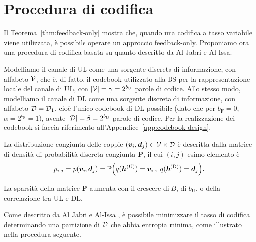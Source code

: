\section{Procedura di codifica}
\label{sec:procedure}

Il Teorema~\ref{thm:feedback-only} mostra che, quando una codifica a tasso
variabile viene utilizzata, è possibile operare un approccio feedback-only.
Proponiamo ora una procedura di codifica basata su quanto descritto da Al Jabri
e Al-Issa.\cite{10.1007/BFb0024445}

Modelliamo il canale di UL come una sorgente discreta di informazione, con
alfabeto \(\mathcal{V}\), che è, di fatto, il codebook utilizzato alla BS per la
rappresentazione locale del canale di UL, con \(\abs{\set{V}} = \gamma =
2^{b_\mathrm{U}}\) parole di codice. Allo stesso modo, modelliamo il canale di
DL come una sorgente discreta di informazione, con alfabeto \(\mathcal{D} =
\mathcal{D}_1\), cioè l'unico codebook di DL possibile (dato che per \(b_\mathrm{F}
= 0\), \(\alpha = 2^{b_\mathrm{F}} = 1\)), avente \(\abs{\set{D}} = \beta =
2^{b_\mathrm{B}}\) parole di codice. Per la realizzazione dei codebook si
faccia riferimento all'Appendice~\ref{app:codebook-design}.

La distribuzione congiunta delle coppie \((\bm{v}_i,\bm{d}_j) \in
\mathcal{V} \times \mathcal{D}\) è descritta dalla matrice di densità di probabilità
discreta congiunta \(\bm{P}\), il cui \((i,j)\)-esimo elemento è
\begin{equation}
    p_{i,j} = p(\bm{v}_i, \bm{d}_j) = \prob{
        q(\bm{h}^\mathrm{(U)}) = \bm{v}_i \:,\;
        q(\bm{h}^\mathrm{(D)}) = \bm{d}_j
    } .
\end{equation}

La sparsità della matrice \(\bm{P}\) aumenta con il crescere di \(B\), di
\(b_\mathrm{U}\), o della correlazione tra UL e DL.

Come descritto da Al Jabri e Al-Issa \cite{10.1007/BFb0024445}, è possibile
minimizzare il tasso di codifica determinando una partizione di \(\mathcal{D}\) che
abbia entropia minima, come illustrato nella procedura seguente.

